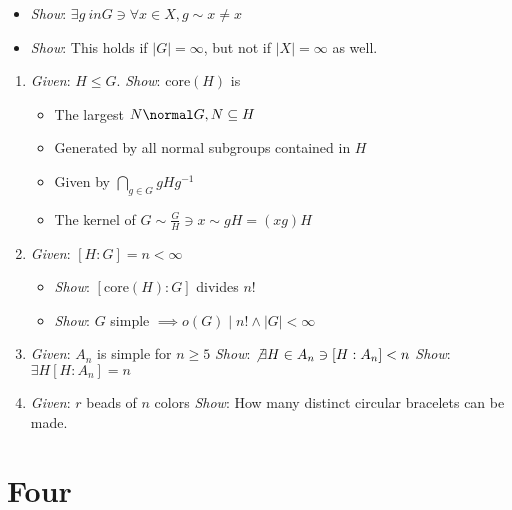 \begin{itemize}
\tightlist
\item
  \emph{Show}: \(\exists g\ in G \ni \forall x\in X, g\sim x \neq x\)
\item
  \emph{Show}: This holds if \(|G| = \infty\), but not if
  \(|X| = \infty\) as well.
\end{itemize}

\begin{enumerate}
\def\labelenumi{\arabic{enumi}.}
\setcounter{enumi}{5}
\item
  \emph{Given}: \(H \leq G\). \emph{Show}: \(\text{core}(H)\) is

  \begin{itemize}
  \tightlist
  \item
    The largest \(N \normal G, N \subseteq H\)
  \item
    Generated by all normal subgroups contained in \(H\)
  \item
    Given by \(\bigcap_{g\in G} gHg^{-1}\)
  \item
    The kernel of \(G \sim \frac{G}{H} \ni x \sim gH = (xg)H\)
  \end{itemize}
\item
  \emph{Given}: \([H : G]= n < \infty\)

  \begin{itemize}
  \tightlist
  \item
    \emph{Show}: \([\text{core}(H) : G]\) divides \(n!\)
  \item
    \emph{Show}: \(G\) simple
    \(\implies o(G) \mid n! \wedge |G| < \infty\)
  \end{itemize}
\item
  \emph{Given}: \(A_n\) is simple for \(n\geq 5\) \emph{Show}:
  \(\not \exists H \in A_n \ni [H : A_n] < n\) \emph{Show}:
  \(\exists H [H : A_n] = n\)
\item
  \emph{Given}: \(r\) beads of \(n\) colors \emph{Show}: How many
  distinct circular bracelets can be made.
\end{enumerate}

\hypertarget{four}{%
\section{Four}\label{four}}

